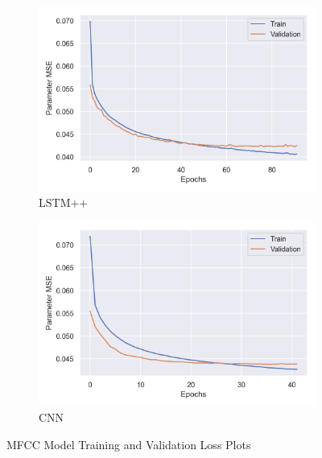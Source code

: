 \begin{figure}[ht]
    \begin{subfigure}[b]{0.49\textwidth}
        \centering
        \includegraphics[width=\textwidth]{figures/inverse-synth/loss-plots/bilstm-mfcc.png}
        \caption{LSTM++}
    \end{subfigure}
    \begin{subfigure}[b]{0.49\textwidth}
        \centering
        \includegraphics[width=\textwidth]{figures/inverse-synth/loss-plots/cnn-mfcc.png}
        \caption{CNN}
    \end{subfigure}
    \caption{MFCC Model Training and Validation Loss Plots}
\end{figure}

